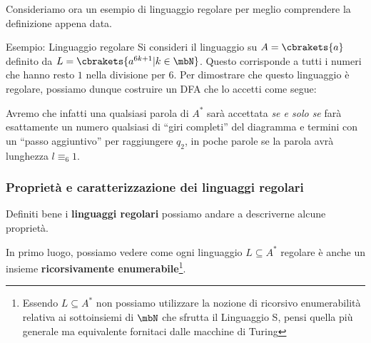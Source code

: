 \newpage

Consideriamo ora un esempio di linguaggio regolare per meglio comprendere la definizione appena data.

\begin{generalbox}[colframe=azure-gradient-3!90!black]{Esempio: Linguaggio regolare}
  Si consideri il linguaggio su \(A=\cbrakets{a}\) definito da \(L=\cbrakets{a^{6k+1} \vert k \in \mbN}\). Questo corrisponde a tutti i numeri che hanno resto \(1\) nella divisione per \(6\). Per dimostrare che questo linguaggio è regolare, possiamo dunque costruire un DFA che lo accetti come segue:

  \medskip
  \begin{center}
  \end{center}

  Avremo che infatti una qualsiasi parola di \(A^*\) sarà accettata \textit{se e solo se} farà esattamente un numero qualsiasi di ``giri completi'' del diagramma e termini con un ``passo aggiuntivo'' per raggiungere \(q_2\), in poche parole se la parola avrà lunghezza \(l \equiv_6 1\).
\end{generalbox}

\subsubsection{Proprietà e caratterizzazione dei linguaggi regolari}

Definiti bene i \textbf{linguaggi regolari} possiamo andare a descriverne alcune proprietà.

In primo luogo, possiamo vedere come ogni linguaggio \(L\subseteq A^*\) regolare è anche un insieme \textbf{ricorsivamente enumerabile}\footnote{ Essendo \(L\subseteq A^*\) non possiamo utilizzare la nozione di ricorsivo enumerabilità relativa ai sottoinsiemi di \(\mbN\) che sfrutta il Linguaggio S, pensi quella più generale ma equivalente fornitaci dalle macchine di Turing}.

